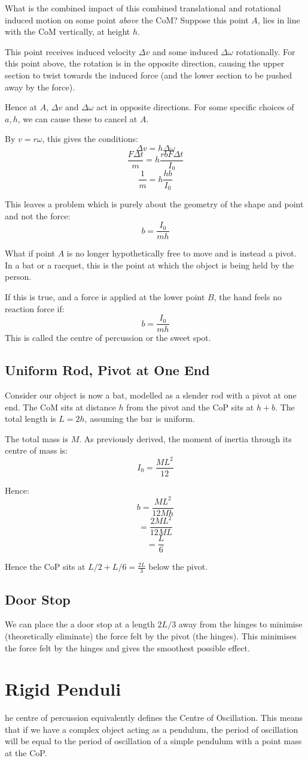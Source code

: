 What is the combined impact of this combined translational and rotational induced motion on some point \emph{above} the CoM? Suppose this point $A$, lies in line with the CoM vertically, at height $h$.

This point receives induced velocity $\Delta v$ and some induced $\Delta \omega$ rotationally. For this point above, the rotation is in the opposite direction, causing the upper section to twist towards the induced force (and the lower section to be pushed away by the force).

Hence at $A$, $\Delta v$ and $\Delta \omega$ act in opposite directions. For some specific choices of $a, h$, we can cause these to cancel at $A$.

By $v = r \omega$, this gives the conditions:
\[
    \Delta v = h \Delta \omega
\]
\[
    \frac{F \Delta t}{m} = h \frac{r b F \Delta t}{I_0}
\]
\[
    \frac{1}{m} = h \frac{h b}{I_0}   
\]

This leaves a problem which is purely about the geometry of the shape and point and not the force:
\[
    b = \frac{I_0}{mh}
\]

What if point $A$ is no longer hypothetically free to move and is instead a pivot. In a bat or a racquet, this is the point at which the object is being held by the person.

If this is true, and a force is applied at the lower point $B$, the hand feels no reaction force if:
\[
    b = \frac{I_0}{mh}
\]
This is called the centre of percussion or the sweet spot.

\subsection{Uniform Rod, Pivot at One End}
Consider our object is now a bat, modelled as a slender rod with a pivot at one end. The CoM sits at distance $h$ from the pivot and the CoP sits at $h + b$. The total length is $L = 2h$, assuming the bar is uniform.

The total mass is $M$. As previously derived, the moment of inertia through its centre of mass is:
\[
    I_0 = \frac{ML^2}{12}
\]

Hence:
\[
    b = \frac{ML^2}{12 M h}
\]
\[
    = \frac{2 ML^2}{12 M L}
\]
\[
    = \frac{L}{6}
\]

Hence the CoP sits at $L/2 + L/6 = \frac{2L}{3}$ below the pivot.

\subsection{Door Stop}
We can place the a door stop at a length $2L/3$ away from the hinges to minimise (theoretically eliminate) the force felt by the pivot (the hinges). This minimises the force felt by the hinges and gives the smoothest possible effect.

\section{Rigid Penduli}
he centre of percussion equivalently defines the Centre of Oscillation. This means that if we have a complex object acting as a pendulum, the period of oscillation will be equal to the period of oscillation of a simple pendulum with a point mass at the CoP.





